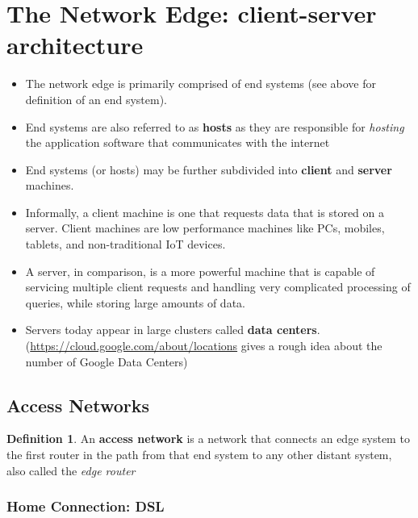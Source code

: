 \documentclass{article}
\theoremstyle{plain}
\theoremstyle{definition}
\newtheorem{defn}{Definition} %
\begin{document}
\section{The Network Edge: client-server architecture}
\begin{itemize}
    \item The network edge is primarily comprised of end systems (see above for definition of an end system).
    
    \item End systems are also referred to as \textbf{hosts} as they are responsible for \textit{hosting} the application software that communicates with the internet
    
    \item End systems (or hosts) may be further subdivided into \textbf{client} and \textbf{server} machines.
    
    \item Informally, a client machine is one that requests data that is stored on a server. Client machines are low performance machines like PCs, mobiles, tablets, and non-traditional IoT devices.
    
    \item A server, in comparison, is a more powerful machine that is capable of servicing multiple client requests and handling very complicated processing of queries, while storing large amounts of data.
    
    \item Servers today appear in large clusters called \textbf{data centers}. (\url{https://cloud.google.com/about/locations} gives a rough idea about the number of Google Data Centers)
\end{itemize}

\subsection{Access Networks}
\begin{defn}
    An \textbf{access network} is a network that connects an edge system to the first router in the path from that end system to any other distant system, also called the \textit{edge router}
\end{defn}

\subsubsection{Home Connection: DSL}
\end{document}

